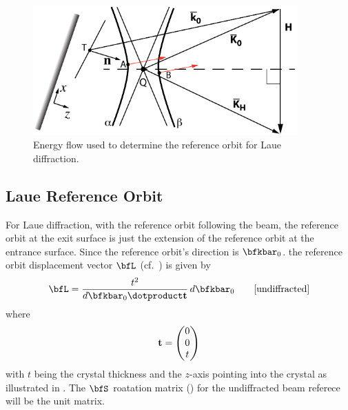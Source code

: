 
\begin{figure}
\centering
\includegraphics[width=4in]{crystal-energy.pdf}
  \caption[Reference energy flow for Laue diffraction]{
Energy flow used to determine the reference orbit for Laue diffraction.
  }
\label{f:crystal.energy}
\end{figure}

\subsection{Laue Reference Orbit}
\label{s:laue.ref}

For Laue diffraction, with the reference orbit following the  beam, the reference
orbit at the exit surface is just the extension of the reference orbit at the entrance
surface. Since the reference orbit's direction is $\bfkbar_0$.  the reference orbit displacement
vector $\bfL$ (cf.~) is given by
\begin{equation}
  \bfL = \frac{t^2}{d\bfkbar_0 \dotproduct \Bf t} \, d\bfkbar_0
  \qquad \text{[undiffracted]}
\end{equation}
where
\begin{equation}
  {\bf t} = \begin{pmatrix}
    0 \\ 0 \\ t
  \end{pmatrix}
\end{equation}
with $t$ being the crystal thickness and the $z$-axis pointing into the crystal as illustrated in
. The $\bfS$ roatation matrix () for the undiffracted beam referece
will be the unit matrix.

